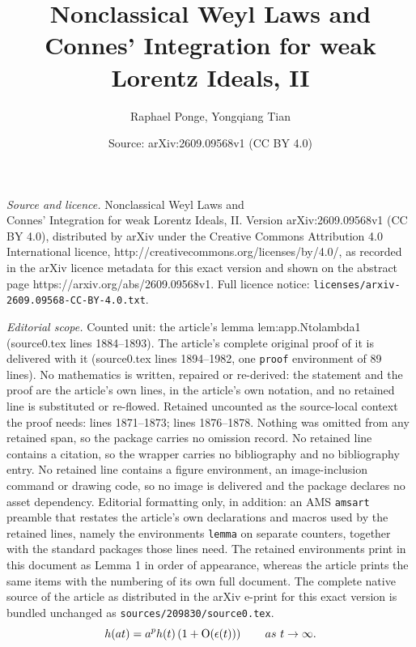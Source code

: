 \documentclass[10pt,a4paper]{amsart}
\title{Nonclassical Weyl Laws and\\ Connes' Integration for weak Lorentz Ideals, II}
\author{Raphael Ponge, Yongqiang Tian}
\date{Source: arXiv:2609.09568v1 (CC BY 4.0)}
\newcommand{\op}{\operatorname}
\begin{document}
\maketitle

\noindent\emph{Source and licence.} Nonclassical Weyl Laws and\\ Connes' Integration for weak Lorentz Ideals, II. Version arXiv:2609.09568v1 (CC BY 4.0), distributed by arXiv under the Creative Commons Attribution 4.0 International licence, http://creativecommons.org/licenses/by/4.0/, as recorded in the arXiv licence metadata for this exact version and shown on the abstract page https://arxiv.org/abs/2609.09568v1. Full licence notice: \texttt{licenses/arxiv-2609.09568-CC-BY-4.0.txt}.\par\smallskip

\noindent\textit{Editorial scope.} Counted unit: the article's lemma lem:app.Ntolambda1 (source0.tex lines 1884--1893). The article's complete original proof of it is delivered with it (source0.tex lines 1894--1982, one \texttt{proof} environment of 89 lines). No mathematics is written, repaired or re-derived: the statement and the proof are the article's own lines, in the article's own notation, and no retained line is substituted or re-flowed.  Retained uncounted as the source-local context the proof needs: lines 1871--1873; lines 1876--1878.  Nothing was omitted from any retained span, so the package carries no omission record.  No retained line contains a citation, so the wrapper carries no bibliography and no bibliography entry.  No retained line contains a figure environment, an image-inclusion command or drawing code, so no image is delivered and the package declares no asset dependency.  Editorial formatting only, in addition: an AMS \texttt{amsart} preamble that restates the article's own declarations and macros used by the retained lines, namely the environments \texttt{lemma} on separate counters, together with the standard packages those lines need.  The retained environments print in this document as Lemma 1 in order of appearance, whereas the article prints the same items with the numbering of its own full document.  The complete native source of the article as distributed in the arXiv e-print for this exact version is bundled unchanged as \texttt{sources/209830/source0.tex}.
 \begin{equation}\label{cond:ii}
 h(at)=a^p h(t)\left(1+\op{O}(\epsilon(t))\right) \qquad \textup{as}\ t\rightarrow \infty.
\end{equation}
\end{document}
